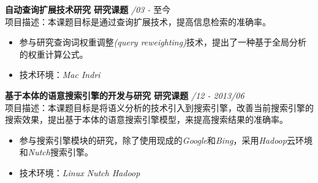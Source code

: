 \documentclass[a4paper]{article}
\newenvironment{changemargin}[2]{%
  \begin{list}{}{%
    \setlength{\topsep}{0pt}%
    \setlength{\leftmargin}{#1}%
    \setlength{\rightmargin}{#2}%
    \setlength{\listparindent}{\parindent}%
    \setlength{\itemindent}{\parindent}%
    \setlength{\parsep}{\parskip}%
  }%
  \item[]}{\end{list}
}
\newenvironment{body} {
	\vspace*{-16pt}
	\begin{changemargin}{-0.25in}{-0.5in}
  }	
	{\end{changemargin}
}
\begin{document}
\begin{body}
	\vspace{14pt}
	
	{\textbf{自动查询扩展技术研究 研究课题}}{} \hfill \emph{/03 - }至今\\
	项目描述：本课题目标是通过查询扩展技术，提高信息检索的准确率。\\
	\vspace*{-6pt}
	\begin{itemize} \itemsep -0pt  %
		\item 参与研究查询词权重调整\emph{\fontarial(query reweighting)}技术，提出了一种基于全局分析的权重计算公式。\\
	\end{itemize}
	\vspace*{-12pt}
	\begin{itemize} \itemsep -0pt  %
		\item 技术环境：\emph{\fontarial Mac Indri}\\
	\end{itemize}
	
	{\textbf{基于本体的语意搜索引擎的开发与研究 研究课题}}{} \hfill \emph{/12 - 2013/06}\\
	项目描述：本课题目标是将语义分析的技术引入到搜索引擎，改善当前搜索引擎的搜索效果，提出基于本体的语意搜索引擎模型，来提高搜索结果的准确率。\\
	\vspace*{-6pt}
	\begin{itemize} \itemsep -0pt  %
		\item 参与搜索引擎模块的研究，除了使用现成的\emph{\fontarial Google}和\emph{\fontarial Bing}，采用\emph{\fontarial Hadoop}云环境和\emph{\fontarial Nutch}搜索引擎。\\
	\end{itemize}
	\vspace*{-12pt}
	\begin{itemize} \itemsep -0pt  %
		\item 技术环境：\emph{\fontarial Linux Nutch Hadoop}\\
	\end{itemize}
	

\end{body}
\end{document}
